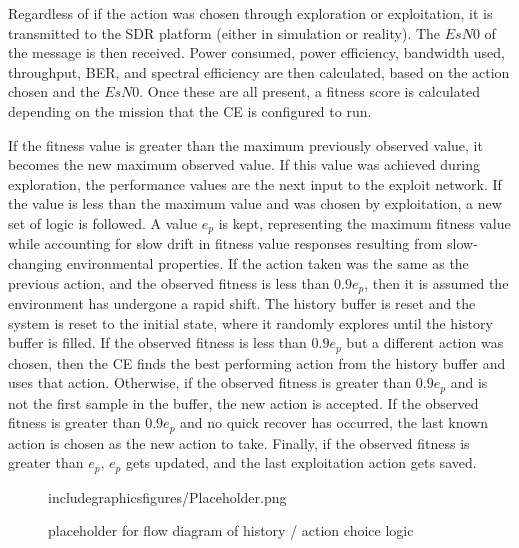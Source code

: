 \par Regardless of if the action was chosen through exploration or exploitation, it is transmitted to the SDR platform (either in simulation or reality). The $EsN0$ of the message is then received.  Power consumed, power efficiency, bandwidth used, throughput, BER, and spectral efficiency are then calculated, based on the action chosen and the $EsN0$. Once these are all present, a fitness score is calculated depending on the mission that the CE is configured to run. 
\par If the fitness value is greater than the maximum previously observed value, it becomes the new maximum observed value. If this value was achieved during exploration, the performance values are the next input to the exploit network. If the value is less than the maximum value and was chosen by exploitation, a new set of logic is followed. A value $e_p$ is kept, representing the maximum fitness value while accounting for slow drift in fitness value responses resulting from slow-changing environmental properties. If the action taken was the same as the previous action, and the observed fitness is less than $0.9 e_p$, then it is assumed the environment has undergone a rapid shift. The history buffer is reset and the system is reset to the initial state, where it randomly explores until the history buffer is filled.  If the observed fitness is less than $0.9 e_p$ but a different action was chosen, then the CE finds the best performing action from the history buffer and uses that action. Otherwise, if the observed fitness is greater than $0.9 e_p$ and is not the first sample in the buffer, the new action is accepted. If the observed fitness is greater than $0.9 e_p$ and no quick recover has occurred, the last known action is chosen as the new action to take. Finally, if the observed fitness is greater than $e_p$, $e_p$ gets updated, and the last exploitation action gets saved. 


\begin{figure}
\caption{placeholder for flow diagram of history / action choice logic}
includegraphics{figures/Placeholder.png}
\end{figure}

